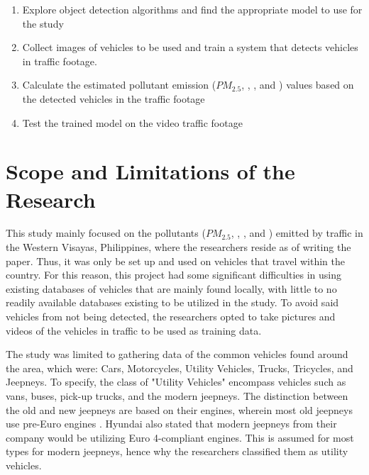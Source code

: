 %
%

\begin{enumerate}
   
   \item Explore object detection algorithms and find the appropriate model to use for the study
   \item Collect images of vehicles to be used and train a system that detects vehicles in traffic footage.
   \item Calculate the estimated pollutant emission ($PM_{2.5}$, , , and ) values based on the detected vehicles in the traffic footage
   \item Test the trained model on the video traffic footage 
   

\end{enumerate}


\section{Scope and Limitations of the Research}
\label{sec:scopelimitations}
This study mainly focused on the pollutants ($PM_{2.5}$, , , and ) emitted by traffic in the Western Visayas, Philippines, where the researchers reside as of writing the paper. Thus, it was only be set up and used on vehicles that travel within the country. For this reason, this project had some significant difficulties in using existing databases of vehicles that are mainly found locally, with little to no readily available databases existing to be utilized in the study. To avoid said vehicles from not being detected, the researchers opted to take pictures and videos of the vehicles in traffic to be used as training data. 

The study was limited to gathering data of the common vehicles found around the area, which were: Cars, Motorcycles, Utility Vehicles, Trucks, Tricycles, and Jeepneys. To specify, the class of "Utility Vehicles" encompass vehicles such as vans, buses, pick-up trucks, and the modern jeepneys. The distinction between the old and new jeepneys are based on their engines, wherein most old jeepneys use pre-Euro engines \cite{rito_lopez_biona_2021}. Hyundai \citeyear{Hyundai_ph} also stated that modern jeepneys from their company would be utilizing Euro 4-compliant engines. This is assumed for most types for modern jeepneys, hence why the researchers classified them as utility vehicles.

